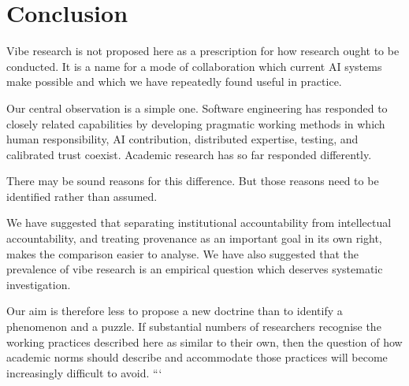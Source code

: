 \section{Conclusion}

Vibe research is not proposed here as a prescription for how research ought to be conducted. It is a name for a mode of collaboration which current AI systems make possible and which we have repeatedly found useful in practice.

Our central observation is a simple one. Software engineering has responded to closely related capabilities by developing pragmatic working methods in which human responsibility, AI contribution, distributed expertise, testing, and calibrated trust coexist. Academic research has so far responded differently.

There may be sound reasons for this difference. But those reasons need to be identified rather than assumed.

We have suggested that separating institutional accountability from intellectual accountability, and treating provenance as an important goal in its own right, makes the comparison easier to analyse. We have also suggested that the prevalence of vibe research is an empirical question which deserves systematic investigation.

Our aim is therefore less to propose a new doctrine than to identify a phenomenon and a puzzle. If substantial numbers of researchers recognise the working practices described here as similar to their own, then the question of how academic norms should describe and accommodate those practices will become increasingly difficult to avoid.
```
